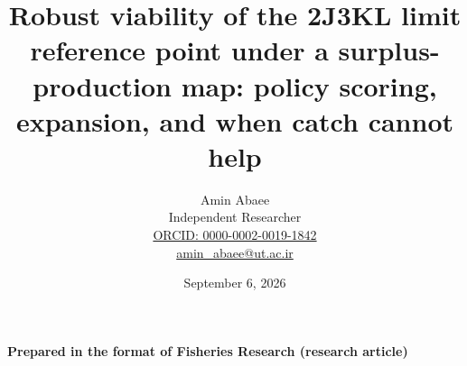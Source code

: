 \documentclass[11pt]{article}
\begin{document}
\title{Robust viability of the 2J3KL limit reference point under a surplus-production map: policy scoring, expansion, and when catch cannot help}
\author{Amin Abaee\\[0.35em]
{\small Independent Researcher}\\[0.55em]
{\small\href{https://orcid.org/0000-0002-0019-1842}{ORCID: 0000-0002-0019-1842}}\\[0.3em]
{\small\href{mailto:amin\_abaee@ut.ac.ir}{amin\_abaee@ut.ac.ir}}}
\date{September 6, 2026}
\maketitle

{\centering\small \textbf{Prepared in the format of Fisheries Research (research article)}\par}
\end{document}
